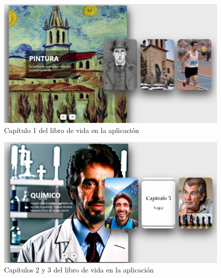 \begin{figure}[!htb]
	\centering
	\includegraphics[width = 1
	\textwidth]{Imagenes/Vectorial/fase1librovidapp.png}
	\caption{Capítulo 1 del libro de vida en la aplicación}
	\label{fig:fase1librovidapp}
\end{figure}

\begin{figure}[!htb]
	\centering
	\includegraphics[width = 1
	\textwidth]{Imagenes/Vectorial/fase23librovidapp.png}
	\caption{Capítulos 2 y 3 del libro de vida en la aplicación}
	\label{fig:fase23librovidapp}
\end{figure}
